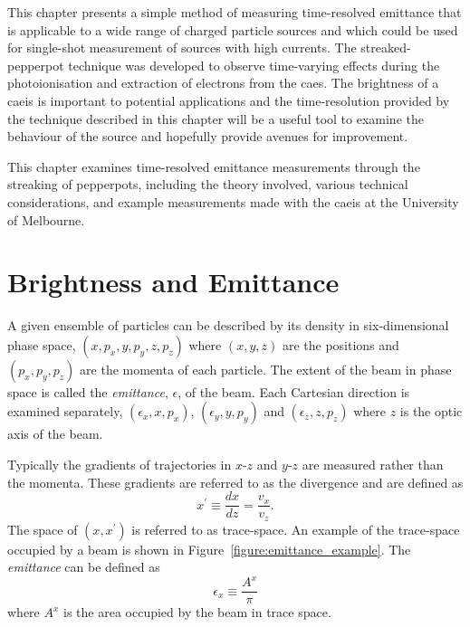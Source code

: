 This chapter presents a simple method of measuring time-resolved emittance that is applicable to a wide range of charged particle sources and which could be used for single-shot measurement of sources with high currents.
The streaked-pepperpot technique was developed to observe time-varying effects during the photoionisation and extraction of electrons from the \gls{caes}.
The brightness of a \gls{caeis} is important to potential applications and the time-resolution provided by the technique described in this chapter will be a useful tool to examine the behaviour of the source and hopefully provide avenues for improvement.

This chapter examines time-resolved emittance measurements through the streaking of pepperpots, including the theory involved, various technical considerations, and example measurements made with the \gls{caeis} at the University of Melbourne.

\section{Brightness and Emittance}

A given ensemble of particles can be described by its density in six-dimensional phase space, $(x, p_x, y, p_y, z, p_z)$ where $(x, y, z)$ are the positions and $(p_x, p_y, p_z)$ are the momenta of each particle.
The extent of the beam in phase space is called the \emph{emittance}, $\epsilon$, of the beam.
Each Cartesian direction is examined separately, $(\epsilon_x, x, p_x)$, $(\epsilon_y, y, p_y)$ and $(\epsilon_z, z, p_z)$ where $z$ is the optic axis of the beam.

Typically the gradients of trajectories in $x$-$z$ and $y$-$z$ are measured rather than the momenta.
These gradients are referred to as the divergence and are defined as
\begin{equation}\label{equation:divergence}
x^\prime \equiv \frac{dx}{dz} = \frac{v_x}{v_z}.
\end{equation}
The space of $(x, x^\prime)$ is referred to as trace-space.
An example of the trace-space occupied by a beam is shown in Figure~\ref{figure:emittance_example}.
The \emph{emittance} can be defined as
\begin{equation}
\epsilon_x \equiv \frac{A^x}{\pi}
\end{equation}
where $A^x$ is the area occupied by the beam in trace space.


